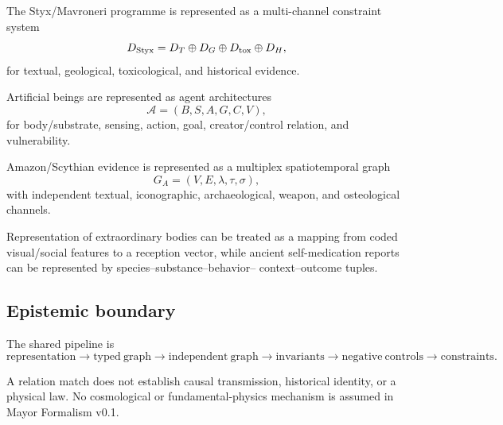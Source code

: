 The Styx/Mavroneri programme is represented as a multi-channel constraint
system
\[
D_{\rm Styx}
=
D_T\oplus D_G\oplus D_{\rm tox}\oplus D_H,
\]
for textual, geological, toxicological, and historical evidence.

Artificial beings are represented as agent architectures
\[
\mathcal A=(B,S,A,G,C,V),
\]
for body/substrate, sensing, action, goal, creator/control relation, and
vulnerability.

Amazon/Scythian evidence is represented as a multiplex spatiotemporal graph
\[
G_A=(V,E,\lambda,\tau,\sigma),
\]
with independent textual, iconographic, archaeological, weapon, and
osteological channels.

Representation of extraordinary bodies can be treated as a mapping from
coded visual/social features to a reception vector, while ancient
self-medication reports can be represented by species--substance--behavior--
context--outcome tuples.

\subsection{Epistemic boundary}

The shared pipeline is
\[
\boxed{
\mathrm{representation}
\to
\mathrm{typed\ graph}
\to
\mathrm{independent\ graph}
\to
\mathrm{invariants}
\to
\mathrm{negative\ controls}
\to
\mathrm{constraints}.
}
\]

A relation match does not establish causal transmission, historical identity,
or a physical law.  No cosmological or fundamental-physics mechanism is
assumed in Mayor Formalism v0.1.
